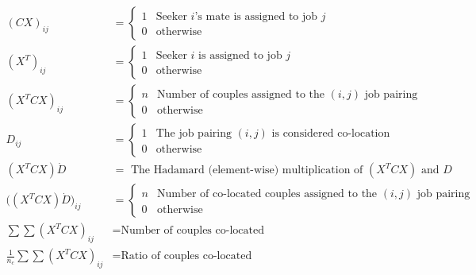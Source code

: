  \begin{align*}
(CX)_{ij} &= \begin{cases}
1 & \text{Seeker $i$'s mate is assigned to job $j$} \\
0& \text{otherwise}
\end{cases} \\
(X^T)_{ij} &= \begin{cases}
1 & \text{Seeker $i$ is assigned to job $j$} \\
0 & \text{otherwise}
\end{cases}\\
(X^TCX)_{ij} &= \begin{cases}
n & \text{Number of couples assigned to the $(i,j)$ job pairing} \\
0 & \text{otherwise}
\end{cases}\\
D_{ij} &= \begin{cases}
1 & \text{The job pairing $(i,j)$ is considered co-location } \\
0 & \text{otherwise}
\end{cases}\\
(X^TCX) \dot D &= \text{ The Hadamard (element-wise) multiplication of $(X^TCX)$ and $D$} \\
\big((X^TCX) \dot D \big)_{ij} &= \begin{cases}
n & \text{Number of co-located couples assigned to the $(i,j)$ job pairing} \\
0 & \text{otherwise}
\end{cases}\\
\sum \sum (X^TCX)_{ij} &= \text{Number of couples co-located} \\
\frac{1}{n_c} \sum \sum (X^TCX)_{ij} &= \text{Ratio of couples co-located}
 \end{align*}

